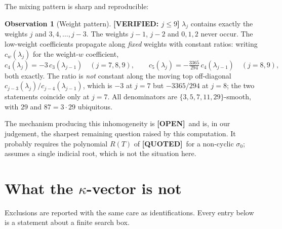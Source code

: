 \documentclass[11pt,reqno]{amsart}
\theoremstyle{plain}
\theoremstyle{definition}
\newtheorem{observation}[theorem]{Observation}
\theoremstyle{remark}
\newcommand{\VER}[1]{{\normalfont\sffamily\bfseries[VERIFIED: #1]}}
\newcommand{\OPEN}{{\normalfont\sffamily\bfseries[OPEN]}}
\newcommand{\QUOTEDMARK}{{\normalfont\sffamily\bfseries[QUOTED]}}
\newcommand{\QUOTED}[1]{\QUOTEDMARK\,#1}
\begin{document}
The mixing pattern is sharp and reproducible:

\begin{observation}[Weight pattern]\label{obs:weights} \VER{$j\le9$}
$\lambda_j$ contains exactly the weights $j$ and $3,4,\dots,j-3$. The weights $j-1$, $j-2$ and
$0,1,2$ never occur. The low-weight coefficients propagate along \emph{fixed} weights with
constant ratios: writing $c_w(\lambda_j)$ for the weight-$w$ coefficient,
\[
  c_4(\lambda_j)=-3\,c_3(\lambda_{j-1})\quad(j=7,8,9),\qquad
  c_5(\lambda_j)=-\tfrac{3365}{294}\,c_4(\lambda_{j-1})\quad(j=8,9),
\]
both exactly. The ratio is \emph{not} constant along the moving top off-diagonal
$c_{j-3}(\lambda_j)/c_{j-4}(\lambda_{j-1})$, which is $-3$ at $j=7$ but $-3365/294$ at $j=8$;
the two statements coincide only at $j=7$. All denominators are
$\{3,5,7,11,29\}$-smooth, with $29$ and $87=3\cdot29$ ubiquitous.
\end{observation}

The mechanism producing this inhomogeneity is \OPEN\ and is, in our judgement, the sharpest
remaining question raised by this computation. It probably requires the polynomial $R(T)$ of
\QUOTED{\cite[Thm.~30]{BV}} for a non-cyclic $\sigma_0$; \cite[Cor.~33]{BV} assumes a single
indicial root, which is not the situation here.

\section{What the \texorpdfstring{$\kappa$}{kappa}-vector is not}\label{sec:exclusions}

Exclusions are reported with the same care as identifications. Every entry below is a statement
about a finite search box.
\end{document}
